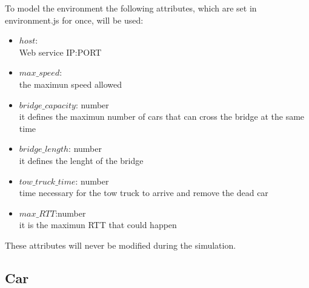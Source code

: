 To model the environment the following attributes, which are set in environment.js for once, will be used:
\begin{itemize}
    \item $host$:\\ Web service IP:PORT
    \item $max\_speed$:\\ the maximun speed allowed
    \item $bridge\_capacity$: number\\ it defines the maximun number of cars that can cross the bridge
    at the same time
    \item $bridge\_length$: number\\ it defines the lenght of the bridge
    \item $tow\_truck\_time$: number\\ time necessary for the tow truck to arrive and remove the dead car
    \item $max\_RTT$:number\\ it is the maximun RTT that could happen
\end{itemize}

These attributes will never be modified during the simulation.

\subsection{Car}

